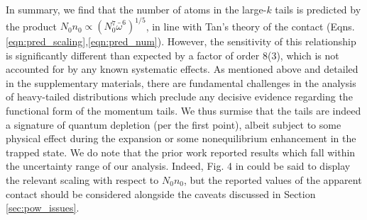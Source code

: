 {	In summary, we find that the number of atoms in the large-$k$ tails is predicted by the product $N_0n_0\propto(N_{0}^7\bar{\omega}^6)^{1/5}$, in line with Tan's theory of the contact (Eqns. \ref{eqn:pred_scaling},\ref{eqn:pred_num}). 
	However, the sensitivity of this relationship is significantly different than expected by a factor of order 8(3), which is not accounted for by any known systematic effects.
	As mentioned above and detailed in the supplementary materials, there are fundamental challenges in the analysis of heavy-tailed distributions which preclude any decisive evidence regarding the functional form of the momentum tails.
	We thus surmise that the tails are indeed a signature of quantum depletion (per the first point), albeit subject to some physical effect during the expansion or some nonequilibrium enhancement in the trapped state.
	We do note that the prior work \cite{Chang16} reported results which fall within the uncertainty range of our analysis.
	Indeed, Fig. 4 in \cite{Chang16} could be said to display the relevant scaling with respect to $N_0n_0$, but the reported values of the apparent contact should be considered alongside the caveats discussed in Section \ref{sec:pow_issues}.



	
}
